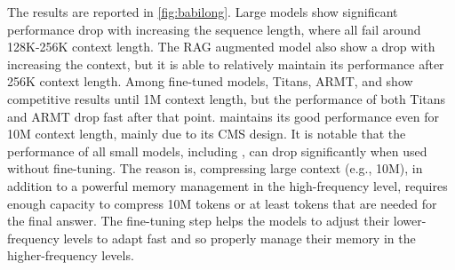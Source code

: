 The results are reported in \autoref{fig:babilong}. Large models show significant performance drop with increasing the sequence length, where all fail around 128K-256K context length. The RAG augmented model also show a drop with increasing the context, but it is able to relatively maintain its performance after 256K context length. Among fine-tuned models, Titans, ARMT, and \model{} show competitive results until 1M context length, but the performance of both Titans and ARMT drop fast after that point. \model{} maintains its good performance even for 10M context length, mainly due to its CMS design. It is notable that the performance of all small models, including \model, can drop significantly when used without fine-tuning. The reason is, compressing large context (e.g., 10M), in addition to a powerful memory management in the high-frequency level, requires enough capacity to compress 10M tokens or at least tokens that are needed for the final answer. The fine-tuning step helps the models to adjust their lower-frequency levels to adapt fast and so properly manage their memory in the higher-frequency levels.   
































































